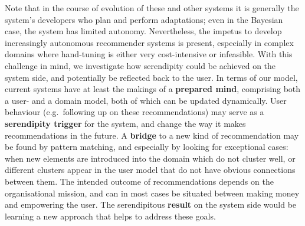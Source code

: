 Note that in the course of evolution of these and other systems it is generally the system's developers who plan and perform adaptations; even in the Bayesian case, the system has limited autonomy. Nevertheless, the impetus to develop increasingly autonomous recommender systems is present, especially in complex domains where hand-tuning is either very cost-intensive or infeasible.  With this challenge in mind, we investigate how serendipity could be achieved on the system side, and potentially be reflected back to the user. In terms of our model, current systems have at least the makings of a \textbf{prepared mind}, comprising both a user- and a domain model, both of which can be updated dynamically. User behaviour (e.g.~following up on these recommendations) may serve as a \textbf{serendipity trigger} for the system, and change the way it makes recommendations in the future. A \textbf{bridge} to a new kind of recommendation may be found by pattern matching, and especially by looking for exceptional cases: when new elements are introduced into the domain which do not cluster well, or different clusters appear in the user model that do not have obvious connections between them. The intended outcome of recommendations depends on the organisational mission, and can in most cases be situated between making money and empowering the user. The serendipitous \textbf{result} on the system side would be learning a new approach that helps to address these goals.

